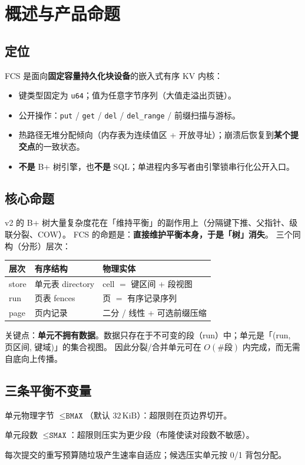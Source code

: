 \section{概述与产品命题}

\subsection{定位}
FCS 是面向\textbf{固定容量持久化块设备}的嵌入式有序 KV 内核：
\begin{itemize}[leftmargin=1.6em]
  \item 键类型固定为 \texttt{u64}；值为任意字节序列（大值走溢出页链）。
  \item 公开操作：\texttt{put} / \texttt{get} / \texttt{del} / \texttt{del\_range} / 前缀扫描与游标。
  \item 热路径无堆分配倾向（内存表为连续值区 + 开放寻址）；崩溃后恢复到\textbf{某个提交点}的一致状态。
  \item \textbf{不是} B+ 树引擎，也\textbf{不是} SQL；单进程内多写者由引擎锁串行化公开入口。
\end{itemize}

\subsection{核心命题}
v2 的 B+ 树大量复杂度花在「维持平衡」的副作用上（分隔键下推、父指针、级联分裂、COW）。
FCS 的命题是：\textbf{直接维护平衡本身，于是「树」消失}。
三个同构（分形）层次：
\begin{center}
\begin{tabular}{@{}lll@{}}
\toprule
层次 & 有序结构 & 物理实体 \\
\midrule
store & 单元表 directory & cell $=$ 键区间 + 段视图 \\
run & 页表 fences & 页 $=$ 有序记录序列 \\
page & 页内记录 & 二分 / 线性 + 可选前缀压缩 \\
\bottomrule
\end{tabular}
\end{center}

关键点：\textbf{单元不拥有数据}。数据只存在于不可变的段（run）中；单元是「(run, 页区间, 键域)」的集合视图。
因此分裂/合并单元可在 $O(\#\text{段})$ 内完成，而无需自底向上传播。

\subsection{三条平衡不变量}
\begin{description}[style=nextline,leftmargin=2.2em]
  \item[B1] 单元物理字节 $\le \texttt{BMAX}$（默认 $32\,\mathrm{KiB}$）：超限则在页边界切开。
  \item[B2] 单元段数 $\le \texttt{SMAX}$：超限则压实为更少段（布隆使读对段数不敏感）。
  \item[B3] 每次提交的重写预算随垃圾产生速率自适应；候选压实单元按 0/1 背包分配。
\end{description}

